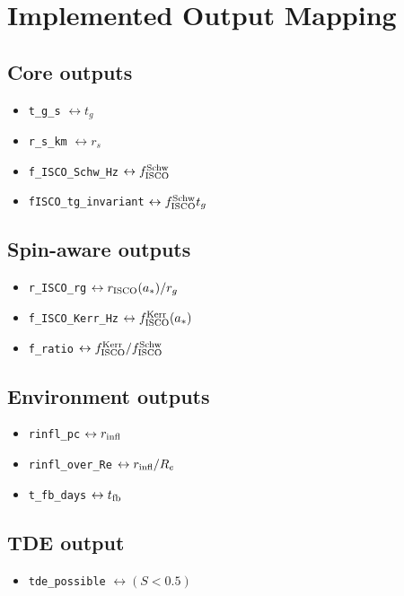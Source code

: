 \documentclass[12pt]{article}
\begin{document}
\section{Implemented Output Mapping}

\subsection*{Core outputs}
\begin{itemize}
    \item \texttt{t\_g\_s} $\leftrightarrow t_g$
    \item \texttt{r\_s\_km} $\leftrightarrow r_s$
    \item \texttt{f\_ISCO\_Schw\_Hz} $\leftrightarrow f_{\rm ISCO}^{\rm Schw}$
    \item \texttt{fISCO\_tg\_invariant} $\leftrightarrow f_{\rm ISCO}^{\rm Schw} t_g$
\end{itemize}

\subsection*{Spin-aware outputs}
\begin{itemize}
    \item \texttt{r\_ISCO\_rg} $\leftrightarrow r_{\rm ISCO}(a_*)/r_g$
    \item \texttt{f\_ISCO\_Kerr\_Hz} $\leftrightarrow f_{\rm ISCO}^{\rm Kerr}(a_*)$
    \item \texttt{f\_ratio} $\leftrightarrow f_{\rm ISCO}^{\rm Kerr}/f_{\rm ISCO}^{\rm Schw}$
\end{itemize}

\subsection*{Environment outputs}
\begin{itemize}
    \item \texttt{rinfl\_pc} $\leftrightarrow r_{\rm infl}$
    \item \texttt{rinfl\_over\_Re} $\leftrightarrow r_{\rm infl}/R_e$
    \item \texttt{t\_fb\_days} $\leftrightarrow t_{\rm fb}$
\end{itemize}

\subsection*{TDE output}
\begin{itemize}
    \item \texttt{tde\_possible} $\leftrightarrow (S<0.5)$
\end{itemize}
\end{document}
